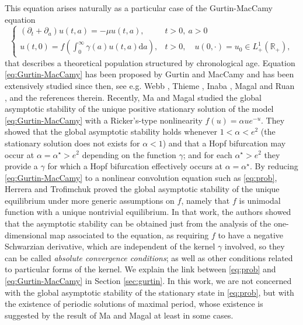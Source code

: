 \documentclass[a4paper,11pt]{article}
\theoremstyle{plain}
\theoremstyle{definition}
\theoremstyle{definition}
\newcommand{\R}{\mathbb{R}}
\newcommand{\dd}{\mathrm{d}}
\numberwithin{equation}{section}
\begin{document}
This equation  arises naturally as a particular case of the  Gurtin-MacCamy equation
\begin{equation}\label{eq:Gurtin-MacCamy}
	\begin{cases}
        (\partial_t + \partial_a)u(t,a) = -\mu u(t,a), & t>0,~ a>0 \\
        u(t,0) = f\left( \int_0^\infty \gamma(a)u(t,a) \dd a \right), & t>0, \quad u(0,\cdot)=u_0\in L^1_+(\R_+), 
\end{cases}
\end{equation}
that describes a theoretical population structured by chronological age. Equation \eqref{eq:Gurtin-MacCamy} has been proposed by Gurtin and MacCamy \cite{Gurtin-MacCamy-1974} and has been extensively studied since then, see e.g. Webb \cite{Webb-1985}, Thieme \cite{Thieme-2003}, Inaba \cite{Inaba-2017}, Magal and Ruan \cite{Magal-Ruan-2018}, and the references therein. Recently,  Ma and Magal \cite{MMa} studied the global asymptotic stability of the unique positive stationary solution of the model \eqref{eq:Gurtin-MacCamy} with a Ricker's-type nonlinearity $f(u)= \alpha ue^{-u}$. They showed that the global asymptotic stability holds whenever $1<\alpha<e^2$ (the stationary solution does not exists for $\alpha<1$) and that a Hopf bifurcation may occur at $\alpha=\alpha^\star>e^2$ depending on the function $\gamma$; and for each $\alpha^\star>e^2$ they provide a $\gamma$ for which a Hopf bifurcation effectively occurs at $\alpha=\alpha^\star$. By reducing \eqref{eq:Gurtin-MacCamy} to a nonlinear convolution equation such as \eqref{eq:prob}, Herrera and Trofimchuk \cite{HT} proved the global asymptotic stability of the unique equilibrium under more generic assumptions on $f$, namely that $f$ is unimodal function with a unique nontrivial equilibrium. In that work, the authors showed that the asymptotic stability can be obtained just from the analysis of the one-dimensional map associated to the equation, as requiring $f$ to have a negative Schwarzian derivative, which are independent of the kernel $\gamma$ involved, so they can be called \emph{absolute convergence conditions}; as well as other conditions related to particular forms of the kernel. We explain the link between \eqref{eq:prob} and \eqref{eq:Gurtin-MacCamy} in Section \ref{sec:gurtin}. In this work, we are not concerned with the global asymptotic stability of the stationary state in \eqref{eq:prob}, but with the existence of periodic solutions of maximal period, whose existence is suggested by the result of Ma and Magal \cite{MMa} at least in some cases.
\end{document}
